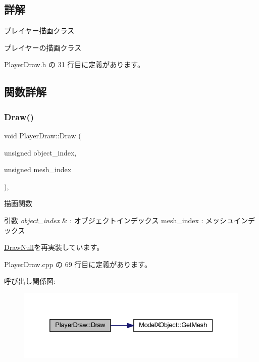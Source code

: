 \subsection{詳解}
プレイヤー描画クラス 

プレイヤーの描画クラス 

 Player\+Draw.\+h の 31 行目に定義があります。



\subsection{関数詳解}
\mbox{\label{class_player_draw_a8b9e8caa6bea7295f58a0aaddeb9458b}} 
\subsubsection{\texorpdfstring{Draw()}{Draw()}}
{\footnotesize\ttfamily void Player\+Draw\+::\+Draw (\begin{DoxyParamCaption}\item[{unsigned}]{object\+\_\+index,  }\item[{unsigned}]{mesh\+\_\+index }\end{DoxyParamCaption})\hspace{0.3cm}{\ttfamily [override]}, {\ttfamily [virtual]}}



描画関数 


\begin{DoxyParams}{引数}
{\em object\+\_\+index} & \+: オブジェクトインデックス mesh\+\_\+index \+: メッシュインデックス \\
\hline
\end{DoxyParams}


\mbox{\hyperlink{class_draw_null_afe50f6fd820b18d673f70f048743f339}{Draw\+Null}}を再実装しています。



 Player\+Draw.\+cpp の 69 行目に定義があります。

呼び出し関係図\+:\nopagebreak
\begin{figure}[H]
\begin{center}
\leavevmode
\includegraphics[width=332pt]{class_player_draw_a8b9e8caa6bea7295f58a0aaddeb9458b_cgraph}
\end{center}
\end{figure}
\mbox{\label{class_player_draw_a6cecfb28942044efff0b9d6213b511a5}} 
